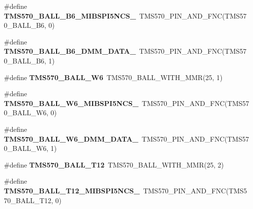 \begin{DoxyCompactItemize}
\item 
\mbox{\label{tms570lc4357-pins_8h_a59fde4841e8967923615fad578eb4da7}} 
\#define {\bfseries T\+M\+S570\+\_\+\+B\+A\+L\+L\+\_\+\+B6\+\_\+\+M\+I\+B\+S\+P\+I5\+N\+C\+S\+\_}~T\+M\+S570\+\_\+\+P\+I\+N\+\_\+\+A\+N\+D\+\_\+\+F\+NC(T\+M\+S570\+\_\+\+B\+A\+L\+L\+\_\+\+B6, 0)
\item 
\mbox{\label{tms570lc4357-pins_8h_a0fdf498ff7f82c0e63cc8620118b7c6a}} 
\#define {\bfseries T\+M\+S570\+\_\+\+B\+A\+L\+L\+\_\+\+B6\+\_\+\+D\+M\+M\+\_\+\+D\+A\+T\+A\+\_}~T\+M\+S570\+\_\+\+P\+I\+N\+\_\+\+A\+N\+D\+\_\+\+F\+NC(T\+M\+S570\+\_\+\+B\+A\+L\+L\+\_\+\+B6, 1)
\item 
\mbox{\label{tms570lc4357-pins_8h_aae7d583a318c1ffed1919ee32b3ead32}} 
\#define {\bfseries T\+M\+S570\+\_\+\+B\+A\+L\+L\+\_\+\+W6}~T\+M\+S570\+\_\+\+B\+A\+L\+L\+\_\+\+W\+I\+T\+H\+\_\+\+M\+MR(25, 1)
\item 
\mbox{\label{tms570lc4357-pins_8h_ab984c59a723527d69528c60c32ef8de6}} 
\#define {\bfseries T\+M\+S570\+\_\+\+B\+A\+L\+L\+\_\+\+W6\+\_\+\+M\+I\+B\+S\+P\+I5\+N\+C\+S\+\_}~T\+M\+S570\+\_\+\+P\+I\+N\+\_\+\+A\+N\+D\+\_\+\+F\+NC(T\+M\+S570\+\_\+\+B\+A\+L\+L\+\_\+\+W6, 0)
\item 
\mbox{\label{tms570lc4357-pins_8h_a970c8bfdbbfbfe912019d5b8e6d22f97}} 
\#define {\bfseries T\+M\+S570\+\_\+\+B\+A\+L\+L\+\_\+\+W6\+\_\+\+D\+M\+M\+\_\+\+D\+A\+T\+A\+\_}~T\+M\+S570\+\_\+\+P\+I\+N\+\_\+\+A\+N\+D\+\_\+\+F\+NC(T\+M\+S570\+\_\+\+B\+A\+L\+L\+\_\+\+W6, 1)
\item 
\mbox{\label{tms570lc4357-pins_8h_ac6a1a27419e52a7e6a99f9793cbd1cbd}} 
\#define {\bfseries T\+M\+S570\+\_\+\+B\+A\+L\+L\+\_\+\+T12}~T\+M\+S570\+\_\+\+B\+A\+L\+L\+\_\+\+W\+I\+T\+H\+\_\+\+M\+MR(25, 2)
\item 
\mbox{\label{tms570lc4357-pins_8h_aa1c49ad364c59bff22ff3df3720fbb4a}} 
\#define {\bfseries T\+M\+S570\+\_\+\+B\+A\+L\+L\+\_\+\+T12\+\_\+\+M\+I\+B\+S\+P\+I5\+N\+C\+S\+\_}~T\+M\+S570\+\_\+\+P\+I\+N\+\_\+\+A\+N\+D\+\_\+\+F\+NC(T\+M\+S570\+\_\+\+B\+A\+L\+L\+\_\+\+T12, 0)
\item 
\mbox{\label{tms570lc4357-pins_8h_a1ed184bbe789dd16e4fcafd2b578d29f}} 

\end{DoxyCompactItemize}
